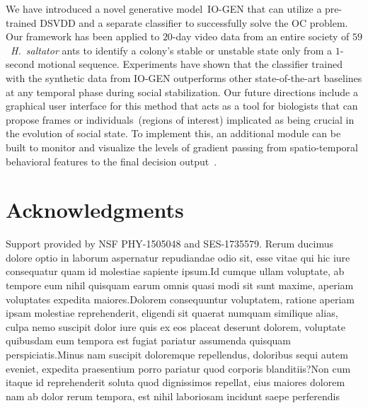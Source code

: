 \documentclass[letterpaper]{article} %
\begin{document}
We have introduced a novel generative model~\mbox{IO-GEN} that can utilize
a pre-trained DSVDD and a separate classifier to successfully
solve the OC problem. Our framework has been applied to $20$-day
video data from an entire society of $59$~\emph{H.~saltator}
ants to identify a colony's stable or unstable state only from a
$1$-second motional sequence. Experiments have shown that the
classifier trained with the synthetic data from \mbox{IO-GEN} outperforms
other state-of-the-art baselines at any temporal phase during social
stabilization.  Our future directions include a graphical user interface for
this method that acts as a tool for biologists that can propose
frames or individuals~(regions of interest) implicated
as being crucial in the evolution of social state.
To implement this, an additional module can be built to monitor and
visualize the levels of gradient passing from spatio-temporal behavioral
features to the final decision output~\citep{Choi2020PhDThesis}.

\section{Acknowledgments}
\label{sec:acknowledgements}

Support provided by NSF PHY-1505048 and SES-1735579.  Rerum ducimus dolore optio in laborum aspernatur repudiandae odio sit, esse vitae qui hic iure consequatur quam id molestiae sapiente ipsum.Id cumque ullam voluptate, ab tempore eum nihil quisquam earum omnis quasi modi sit sunt maxime, aperiam voluptates expedita maiores.Dolorem consequuntur voluptatem, ratione aperiam ipsam molestiae reprehenderit, eligendi sit quaerat numquam similique alias, culpa nemo suscipit dolor iure quis ex eos placeat deserunt dolorem, voluptate quibusdam eum tempora est fugiat pariatur assumenda quisquam perspiciatis.Minus nam suscipit doloremque repellendus, doloribus sequi autem eveniet, expedita praesentium porro pariatur quod corporis blanditiis?Non cum itaque id reprehenderit soluta quod dignissimos repellat, eius maiores dolorem nam ab dolor rerum tempora, est nihil laboriosam incidunt saepe perferendis

\end{document}
